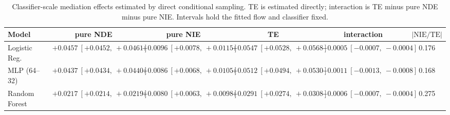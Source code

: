 \begin{table}[htbp]
  \centering
  \caption{Classifier-scale mediation effects estimated by direct conditional sampling. TE is estimated directly; interaction is TE minus pure NDE minus pure NIE. Intervals hold the fitted flow and classifier fixed.}
  \label{tab:german_synth_m0_gap_overall}
  \begin{tabular}{lccccc}
    \toprule
    Model & pure NDE & pure NIE & TE & interaction & $|\mathrm{NIE}/\mathrm{TE}|$ \\
    \midrule
    Logistic Reg. & $+0.0457\ [+0.0452,\ +0.0461]$ & $+0.0096\ [+0.0078,\ +0.0115]$ & $+0.0547\ [+0.0528,\ +0.0568]$ & $-0.0005\ [-0.0007,\ -0.0004]$ & 0.176 \\
    MLP (64--32) & $+0.0437\ [+0.0434,\ +0.0440]$ & $+0.0086\ [+0.0068,\ +0.0105]$ & $+0.0512\ [+0.0494,\ +0.0530]$ & $-0.0011\ [-0.0013,\ -0.0008]$ & 0.168 \\
    Random Forest & $+0.0217\ [+0.0214,\ +0.0219]$ & $+0.0080\ [+0.0063,\ +0.0098]$ & $+0.0291\ [+0.0274,\ +0.0308]$ & $-0.0006\ [-0.0007,\ -0.0004]$ & 0.275 \\
    \bottomrule
  \end{tabular}
\end{table}